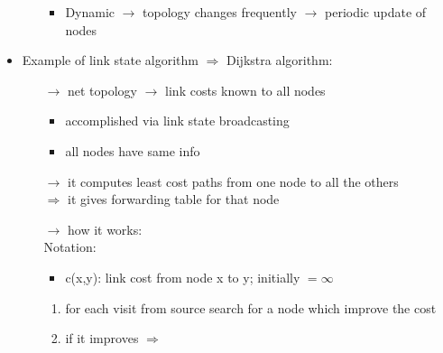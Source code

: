 \begin{itemize}
\begin{itemize}
\begin{itemize}
            \item Dynamic $\rightarrow$ topology changes frequently $\rightarrow$ periodic update of nodes
        \end{itemize}
    \end{itemize}
    \item Example of link state algorithm $\Rightarrow$ Dijkstra algorithm:
    \begin{itemize}
        \item[$\rightarrow$] net topology $\rightarrow$ link costs known to all nodes
        \begin{itemize}
            \item accomplished via link state broadcasting
            \item all nodes have same info
        \end{itemize}
        \item[$\rightarrow$] it computes least cost paths from one node to all the others\\
        $\Rightarrow$ it gives forwarding table for that node
        \item[$\rightarrow$] how it works:\\
        Notation:
        \begin{itemize}
            \item c(x,y): link cost from node x to y; initially $= \infty$
        \end{itemize}
        \begin{enumerate}
            \item for each visit from source search for a node which improve the cost
            \item if it improves $\Rightarrow$ 
        \end{enumerate}
    \end{itemize}
\end{itemize}